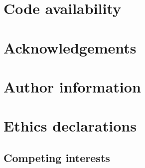 \section{Code availability}

\section{Acknowledgements}

\section{Author information}

\section{Ethics declarations}

\subsection{Competing interests}

